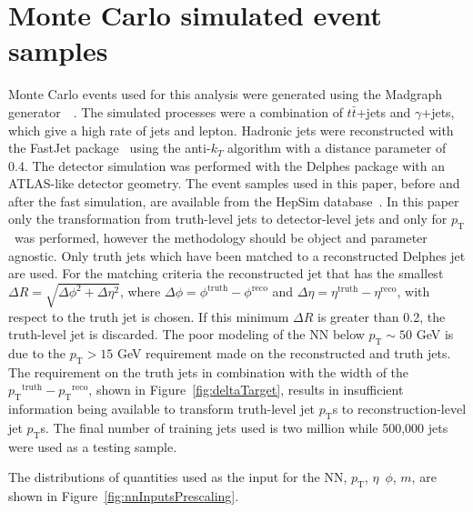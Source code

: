 \documentclass[showpacs,showkeys,preprint,prd,nofootinbib,linenumbers,12pt]{revtex4-1}
\def\pt{\ensuremath{p_{\mathrm{T}}}}
\def\ptRes{\ensuremath{\pt^{\mathrm{truth}}-\pt^{\mathrm{reco}}}}
\begin{document}
\section{Monte Carlo simulated event samples}

Monte Carlo events used for this analysis were generated using the Madgraph generator~~\cite{Alwall:2014hca}. The simulated processes were a combination of $t\bar{t}$+jets and $\gamma$+jets, which give a high rate of jets and lepton. 
Hadronic jets were reconstructed with the {\sc FastJet} package~\cite{Fastjet} using the anti-$k_T$ algorithm \cite{Cacciari:2008gp} with a distance parameter of 0.4. The detector simulation was performed with the Delphes package \cite{deFavereau:2013fsa} with an ATLAS-like detector geometry. 
The event samples used in this paper, before and after the fast simulation, are available from the HepSim database~\cite{Chekanov:2014fga}. In this paper only the transformation from truth-level jets to detector-level jets and only for \pt\ was performed, however the methodology should be object and parameter agnostic. Only truth jets which have been matched to a reconstructed Delphes jet are used. For the matching criteria the reconstructed jet that has the smallest $\Delta R=\sqrt{\Delta\phi^2+\Delta\eta^2}$, where $\Delta\phi=\phi^{\text{truth}}-\phi^{\text{reco}}$ and $\Delta\eta=\eta^{\text{truth}}-\eta^{\text{reco}}$, with respect to the truth jet is chosen. If this minimum $\Delta R$ is greater than 0.2, the truth-level jet is discarded.
The poor modeling of the NN below $\pt\sim 50$ GeV is due to the $\pt>15$ GeV requirement made on the reconstructed and truth jets. The requirement on the truth jets in combination with the width of the \ptRes, shown in Figure~\ref{fig:deltaTarget}, results in insufficient information being available to transform truth-level jet \pt s to reconstruction-level jet \pt s.
The final number of training jets used is two million while 500,000 jets were used as a testing sample.  

The distributions of quantities used as the input for the NN, \pt, $\eta$\, $\phi$, $m$, are shown in Figure~\ref{fig:nnInputsPrescaling}.
\end{document}
